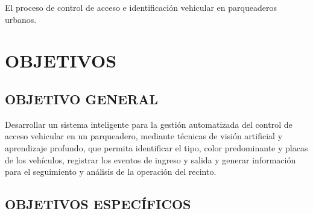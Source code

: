 El proceso de control de acceso e identificación vehicular en parqueaderos urbanos.

\section*{OBJETIVOS}

\subsection*{OBJETIVO GENERAL}

Desarrollar un sistema inteligente para la gestión automatizada del control de
acceso vehicular en un parqueadero, mediante técnicas de visión artificial y
aprendizaje profundo, que permita identificar el tipo, color predominante y placas
de los vehículos, registrar los eventos de ingreso y salida y generar información 
para el seguimiento y análisis de la operación del recinto.

\subsection*{OBJETIVOS ESPECÍFICOS}

